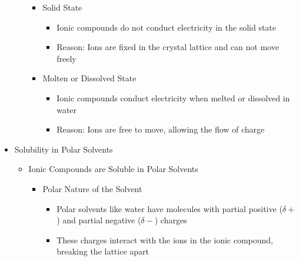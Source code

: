 \begin{itemize}
\begin{itemize}
        \begin{itemize}

          \item Solid State

            \begin{itemize}

              \item Ionic compounds do not conduct electricity in the solid state

              \item Reason: Ions are fixed in the crystal lattice and can not move freely

            \end{itemize}

          \item Molten or Dissolved State

            \begin{itemize}

              \item Ionic compounds conduct electricity when melted or dissolved in water

              \item Reason: Ions are free to move, allowing the flow of charge

            \end{itemize}

        \end{itemize}

    \end{itemize}

  \item Solubility in Polar Solvents

    \begin{itemize}

      \item Ionic Compounds are Soluble in Polar Solvents

        \begin{itemize}

          \item Polar Nature of the Solvent

            \begin{itemize}

              \item Polar solvents like water have molecules with partial positive ($\delta+$) and partial negative ($\delta-$) charges

              \item These charges interact with the ions in the ionic compound, breaking the lattice apart


\end{itemize}
\end{itemize}
\end{itemize}
\end{itemize}
